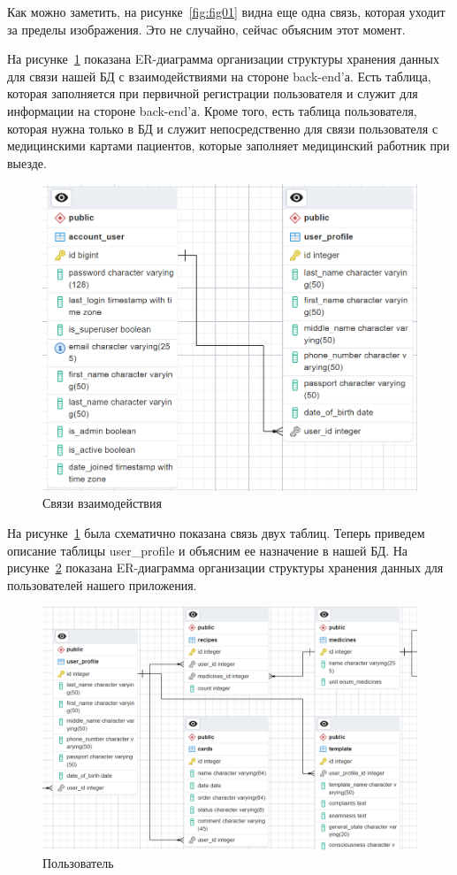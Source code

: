 Как можно заметить, на рисунке~\ref{fig:fig01} видна еще одна связь, которая уходит за пределы изображения. Это не случайно, сейчас объясним этот момент.

На рисунке~\ref{fig:fig02} показана ER-диаграмма организации структуры хранения данных для связи нашей БД с взаимодействиями на стороне back-end'а. Есть таблица, которая заполняется при первичной регистрации пользователя и служит для информации на стороне back-end'а. Кроме того, есть таблица пользователя, которая нужна только в БД и служит непосредственно для связи пользователя с медицинскими картами пациентов, которые заполняет медицинский работник при выезде.

\begin{figure}
  \includegraphics[scale=0.655]{inc/user_account_user_profile}
  \caption{Связи взаимодействия}
  \label{fig:fig02}
\end{figure}

На рисунке~\ref{fig:fig02} была схематично показана связь двух таблиц. Теперь приведем описание таблицы user\_profile и объясним ее назначение в нашей БД. На рисунке~\ref{fig:fig03} показана ER-диаграмма организации структуры хранения данных для пользователей нашего приложения.

\begin{figure}
  \includegraphics[scale=0.54]{inc/user_profile}
  \caption{Пользователь}
  \label{fig:fig03}
\end{figure}

